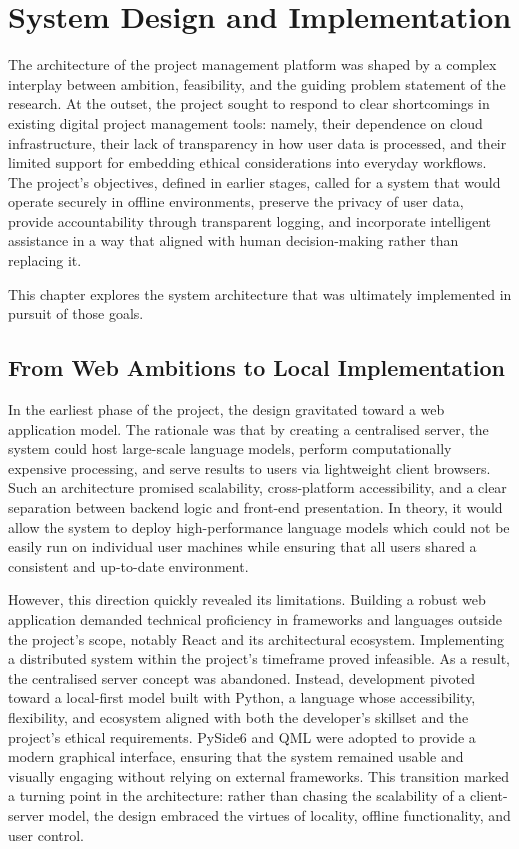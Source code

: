 \documentclass{report}
\begin{document}
\chapter{System Design and Implementation}

The architecture of the project management platform was shaped by a complex interplay between ambition, feasibility, and the guiding problem statement of the research. 
At the outset, the project sought to respond to clear shortcomings in existing digital project management tools: namely, their dependence on cloud infrastructure, their lack of transparency in how user data is processed, and their limited support for embedding ethical considerations into everyday workflows. 
The project's objectives, defined in earlier stages, called for a system that would operate securely in offline environments, preserve the privacy of user data, provide accountability through transparent logging, and incorporate intelligent assistance in a way that aligned with human decision-making rather than replacing it.

This chapter explores the system architecture that was ultimately implemented in pursuit of those goals. 

\section{From Web Ambitions to Local Implementation}

In the earliest phase of the project, the design gravitated toward a web application model. 
The rationale was that by creating a centralised server, the system could host large-scale language models, perform computationally expensive processing, and serve results to users via lightweight client browsers. 
Such an architecture promised scalability, cross-platform accessibility, and a clear separation between backend logic and front-end presentation. 
In theory, it would allow the system to deploy high-performance language models which could not be easily run on individual user machines while ensuring that all users shared a consistent and up-to-date environment.

However, this direction quickly revealed its limitations. Building a robust web application demanded technical proficiency in frameworks and languages outside the project's scope, notably React and its architectural ecosystem. 
Implementing a distributed system within the project's timeframe proved infeasible. 
As a result, the centralised server concept was abandoned. 
Instead, development pivoted toward a local-first model built with Python, a language whose accessibility, flexibility, and ecosystem aligned with both the developer's skillset and the project's ethical requirements. 
PySide6 and QML were adopted to provide a modern graphical interface, ensuring that the system remained usable and visually engaging without relying on external frameworks. 
This transition marked a turning point in the architecture: rather than chasing the scalability of a client-server model, the design embraced the virtues of locality, offline functionality, and user control.
\end{document}
